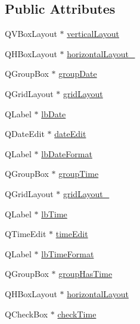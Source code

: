 \subsection*{Public Attributes}
\begin{DoxyCompactItemize}
\item 
QVBoxLayout $\ast$ \hyperlink{class_ui___date_time_a5b1cbbfbf53e56fae7a1d7010cd6dd78}{verticalLayout}
\item 
QHBoxLayout $\ast$ \hyperlink{class_ui___date_time_a4a83e6da2cb4777c714707d0ec9ef071}{horizontalLayout\_}
\item 
QGroupBox $\ast$ \hyperlink{class_ui___date_time_aa589c9b11f049e55441921472edf5edb}{groupDate}
\item 
QGridLayout $\ast$ \hyperlink{class_ui___date_time_afd7d89b895d622f67653fc453dc781a7}{gridLayout}
\item 
QLabel $\ast$ \hyperlink{class_ui___date_time_a2c9c40ac284a6523d361201e4c0c2ec7}{lbDate}
\item 
QDateEdit $\ast$ \hyperlink{class_ui___date_time_ac05a6b58da81b4d73730ab4deffc37d7}{dateEdit}
\item 
QLabel $\ast$ \hyperlink{class_ui___date_time_ae2e82ce0d9b527827658c605e4f814e7}{lbDateFormat}
\item 
QGroupBox $\ast$ \hyperlink{class_ui___date_time_a0228c72e4210b7e2325f003f7b0525bd}{groupTime}
\item 
QGridLayout $\ast$ \hyperlink{class_ui___date_time_a5e283d401d2a14332b5c057dca4b5191}{gridLayout\_}
\item 
QLabel $\ast$ \hyperlink{class_ui___date_time_a3a3c6501192cd0e3d6586310689bcd3f}{lbTime}
\item 
QTimeEdit $\ast$ \hyperlink{class_ui___date_time_a37289c6e591cee258708a9736b503415}{timeEdit}
\item 
QLabel $\ast$ \hyperlink{class_ui___date_time_a8701c245df77db5561ea1c0964c20a8f}{lbTimeFormat}
\item 
QGroupBox $\ast$ \hyperlink{class_ui___date_time_ae9887b3a8b4e56cf1cac0d542819c98d}{groupHasTime}
\item 
QHBoxLayout $\ast$ \hyperlink{class_ui___date_time_a2643fceafcdce6541af710a79f579301}{horizontalLayout}
\item 
QCheckBox $\ast$ \hyperlink{class_ui___date_time_acd3af509eccfb3a359c9a76ea8dfa2d4}{checkTime}
\end{DoxyCompactItemize}


